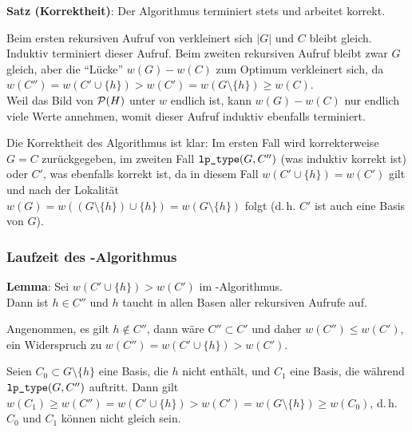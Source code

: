 \textbf{Satz (Korrektheit)}:
Der Algorithmus terminiert stets und arbeitet korrekt.

\begin{Beweis}
    Beim ersten rekursiven Aufruf von  verkleinert sich $|G|$ und $C$ bleibt gleich.
    Induktiv terminiert dieser Aufruf.
    Beim zweiten rekursiven Aufruf bleibt zwar $G$ gleich, aber die "`Lücke"' $w(G) - w(C)$
    zum Optimum verkleinert sich, da\\
    $w(C'') = w(C' \cup \{h\}) > w(C') = w(G \setminus \{h\}) \ge w(C)$.\\
    Weil das Bild von $\P(H)$ unter $w$ endlich ist, kann $w(G) - w(C)$ nur endlich viele Werte
    annehmen, womit dieser Aufruf induktiv ebenfalls terminiert.
    
    Die Korrektheit des Algorithmus ist klar:
    Im ersten Fall wird korrekterweise $G = C$ zurückgegeben,
    im zweiten Fall $\code{lp\_type}(G, C'')$ (was induktiv korrekt ist) oder
    $C'$, was ebenfalls korrekt ist, da in diesem Fall $w(C' \cup \{h\}) = w(C')$ gilt und nach
    der Lokalität\\
    $w(G) = w((G \setminus \{h\}) \cup \{h\}) = w(G \setminus \{h\})$ folgt
    (d.\,h. $C'$ ist auch eine Basis von $G$).
\end{Beweis}

\pagebreak

\subsubsection{%
    Laufzeit des -Algorithmus%
}

\textbf{Lemma}:
Sei $w(C' \cup \{h\}) > w(C')$ im -Algorithmus.\\
Dann ist $h \in C''$ und $h$ taucht in allen Basen aller rekursiven Aufrufe auf.

\begin{Beweis}
    Angenommen, es gilt $h \notin C''$,
    dann wäre $C'' \subset C'$ und daher $w(C'') \le w(C')$,
    ein Widerspruch zu $w(C'') = w(C' \cup \{h\}) > w(C')$.
    
    Seien $C_0 \subset G \setminus \{h\}$ eine Basis, die $h$ nicht enthält,
    und $C_1$ eine Basis, die während $\code{lp\_type}(G, C'')$ auftritt.
    Dann gilt $w(C_1) \ge w(C'') = w(C' \cup \{h\}) > w(C') = w(G \setminus \{h\}) \ge w(C_0)$,
    d.\,h. $C_0$ und $C_1$ können nicht gleich sein.
\end{Beweis}

\linie

